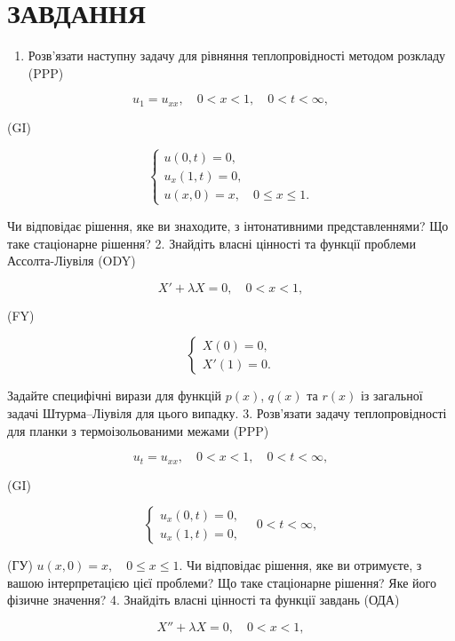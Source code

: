 \documentclass[
  ukrainian,
]{article}
\providecommand{\tightlist}{%
  \setlength{\itemsep}{0pt}\setlength{\parskip}{0pt}}
\begin{document}
\section{ЗАВДАННЯ}\label{ux437ux430ux432ux434ux430ux43dux43dux44f}

\begin{enumerate}
\def\labelenumi{\arabic{enumi}.}
\tightlist
\item
  Розв'язати наступну задачу для рівняння теплопровідності методом
  розкладу (PPP)
\end{enumerate}

\[
u_1 = u_{xx}, \quad 0 < x < 1, \quad 0 < t < \infty,
\]

(GI)

\[
\begin{cases} u(0, t) = 0, \\ u_x(1, t) = 0, \\ u(x, 0) = x, \quad 0 \le x \le 1. \end{cases}
\]

Чи відповідає рішення, яке ви знаходите, з інтонативними
представленнями? Що таке стаціонарне рішення? 2. Знайдіть власні
цінності та функції проблеми Ассолта-Ліувіля (ODY)

\[
X' + \lambda X = 0, \quad 0 < x < 1,
\]

(FY)

\[
\begin{cases} X(0) = 0, \\ X'(1) = 0. \end{cases}
\]

Задайте специфічні вирази для функцій \(p(x)\), \(q(x)\) та \(r(x)\) із
загальної задачі Штурма--Ліувіля для цього випадку. 3. Розв'язати задачу
теплопровідності для планки з термоізольованими межами (PPP)

\[
u_t = u_{xx}, \quad 0 < x < 1, \quad 0 < t < \infty,
\]

(GI)

\[
\begin{cases} u_x (0, t) = 0, \\ u_x (1, t) = 0, \end{cases} \quad 0 < t < \infty,
\]

(ГУ) \(u(x, 0) = x, \quad 0 \le x \le 1.\) Чи відповідає рішення, яке ви
отримуєте, з вашою інтерпретацією цієї проблеми? Що таке стаціонарне
рішення? Яке його фізичне значення? 4. Знайдіть власні цінності та
функції завдань (ОДА)

\[
X'' + \lambda X = 0, \quad 0 < x < 1,
\]
\end{document}
